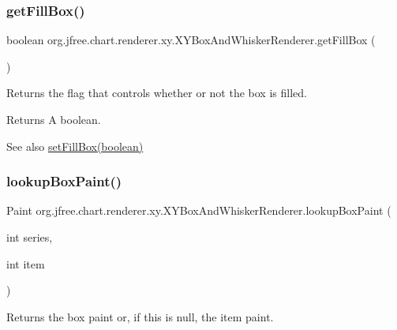 \subsubsection{\texorpdfstring{get\+Fill\+Box()}{getFillBox()}}
{\footnotesize\ttfamily boolean org.\+jfree.\+chart.\+renderer.\+xy.\+X\+Y\+Box\+And\+Whisker\+Renderer.\+get\+Fill\+Box (\begin{DoxyParamCaption}{ }\end{DoxyParamCaption})}

Returns the flag that controls whether or not the box is filled.

\begin{DoxyReturn}{Returns}
A boolean.
\end{DoxyReturn}
\begin{DoxySeeAlso}{See also}
\mbox{\hyperlink{classorg_1_1jfree_1_1chart_1_1renderer_1_1xy_1_1_x_y_box_and_whisker_renderer_adca86c2d9224085f5d51c5d0f2994193}{set\+Fill\+Box(boolean)}} 
\end{DoxySeeAlso}
\mbox{\label{classorg_1_1jfree_1_1chart_1_1renderer_1_1xy_1_1_x_y_box_and_whisker_renderer_a748c865cc3b8272d8fd802620dd78942}} 
\subsubsection{\texorpdfstring{lookup\+Box\+Paint()}{lookupBoxPaint()}}
{\footnotesize\ttfamily Paint org.\+jfree.\+chart.\+renderer.\+xy.\+X\+Y\+Box\+And\+Whisker\+Renderer.\+lookup\+Box\+Paint (\begin{DoxyParamCaption}\item[{int}]{series,  }\item[{int}]{item }\end{DoxyParamCaption})\hspace{0.3cm}{\ttfamily [protected]}}

Returns the box paint or, if this is {\ttfamily null}, the item paint.


